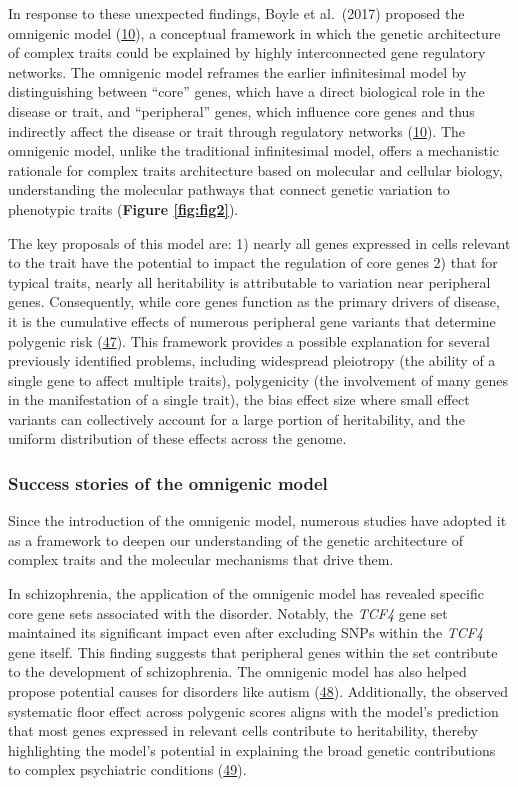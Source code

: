 In response to these unexpected findings, Boyle et al.~(2017) proposed the omnigenic model (\protect\hyperlink{ref-vpIDZCSa}{10}), a conceptual framework in which the genetic architecture of complex traits could be explained by highly interconnected gene regulatory networks.
The omnigenic model reframes the earlier infinitesimal model by distinguishing between ``core'' genes, which have a direct biological role in the disease or trait, and ``peripheral'' genes, which influence core genes and thus indirectly affect the disease or trait through regulatory networks (\protect\hyperlink{ref-vpIDZCSa}{10}).
The omnigenic model, unlike the traditional infinitesimal model, offers a mechanistic rationale for complex traits architecture based on molecular and cellular biology, understanding the molecular pathways that connect genetic variation to phenotypic traits (\textbf{Figure \ref{fig:fig2}}).

The key proposals of this model are: 1) nearly all genes expressed in cells relevant to the trait have the potential to impact the regulation of core genes 2) that for typical traits, nearly all heritability is attributable to variation near peripheral genes.
Consequently, while core genes function as the primary drivers of disease, it is the cumulative effects of numerous peripheral gene variants that determine polygenic risk (\protect\hyperlink{ref-LXvTZzEA}{47}).
This framework provides a possible explanation for several previously identified problems, including widespread pleiotropy (the ability of a single gene to affect multiple traits), polygenicity (the involvement of many genes in the manifestation of a single trait), the bias effect size where small effect variants can collectively account for a large portion of heritability, and the uniform distribution of these effects across the genome.

\hypertarget{success-stories-of-the-omnigenic-model}{%
\subsubsection{Success stories of the omnigenic model}\label{success-stories-of-the-omnigenic-model}}

Since the introduction of the omnigenic model, numerous studies have adopted it as a framework to deepen our understanding of the genetic architecture of complex traits and the molecular mechanisms that drive them.

In schizophrenia, the application of the omnigenic model has revealed specific core gene sets associated with the disorder.
Notably, the \emph{TCF4} gene set maintained its significant impact even after excluding SNPs within the \emph{TCF4} gene itself.
This finding suggests that peripheral genes within the set contribute to the development of schizophrenia. The omnigenic model has also helped propose potential causes for disorders like autism (\protect\hyperlink{ref-QOu3jHOO}{48}).
Additionally, the observed systematic floor effect across polygenic scores aligns with the model's prediction that most genes expressed in relevant cells contribute to heritability, thereby highlighting the model's potential in explaining the broad genetic contributions to complex psychiatric conditions (\protect\hyperlink{ref-fV6THoBG}{49}).

